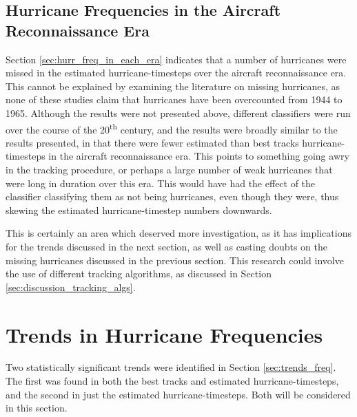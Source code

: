 \documentclass[pdftex,12pt,a4paper]{report}
\newcommand{\ts}{\textsuperscript}
\begin{document}

\subsection{Hurricane Frequencies in the Aircraft Reconnaissance Era}
Section \ref{sec:hurr_freq_in_each_era} indicates that a number of hurricanes were missed in the
estimated hurricane-timesteps over the aircraft reconnaissance era. This cannot be explained
by examining the literature on missing hurricanes, as none of these studies claim that hurricanes
have been overcounted from 1944 to 1965. Although the results were not presented above, different
classifiers were run over the course of the 20\ts{th} century, and the results were broadly similar
to the results presented, in that there were fewer estimated than best tracks hurricane-timesteps in
the aircraft reconnaissance era. This points to something going awry in the
tracking procedure, or perhaps a large number of weak hurricanes that were long in duration over
this era. This would have had the effect of the classifier classifying them as not being hurricanes,
even though they were, thus skewing the estimated hurricane-timestep numbers downwards. 

This is certainly an area which deserved more investigation, as it has implications for the trends
discussed in the next section, as well as casting doubts on the missing hurricanes discussed in the
previous section. This research could involve the use of different tracking algorithms, as discussed
in Section \ref{sec:discussion_tracking_algs}.

\section{Trends in Hurricane Frequencies}
Two statistically significant trends were identified in Section \ref{sec:trends_freq}. The first was
found in both the best tracks and estimated hurricane-timesteps, and the second in just the
estimated hurricane-timesteps. Both will be considered in this section.
\end{document}
